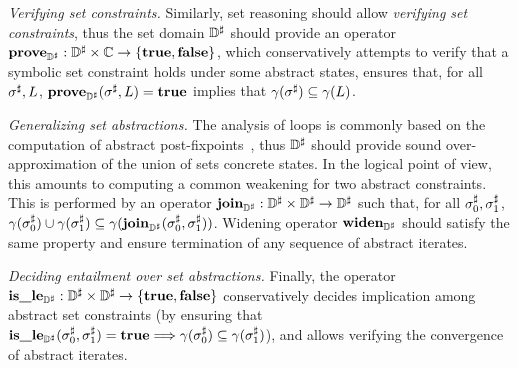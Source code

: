 \begin{asparaitem}
\item \emph{Verifying set constraints.}
  Similarly, set reasoning should allow {\em verifying
    set constraints}, thus the set domain \( {\mathbb{D}}^{\sharp} \) should provide an operator
  \( \textbf{prove}_{{\mathbb{D}}^{\sharp}}: {\mathbb{D}}^{\sharp} \times \mathbb{C} \rightarrow \{ \mathbf{true}, \mathbf{false} \} \),
  which conservatively attempts to verify that a symbolic set constraint
  holds under some abstract states, \ie ensures that, for all \( {\sigma}^{\sharp},
  L \), \( \textbf{prove}_{{\mathbb{D}}^{\sharp}}( {\sigma}^{\sharp}, L ) = \mathbf{true} \) implies that
  \( \gamma( {\sigma}^{\sharp} ) \subseteq \gamma( L ) \).

\item \emph{Generalizing set abstractions.}
  The analysis of loops is commonly based on the computation of abstract
  post-fixpoints~\cite{cc:popl:77}, thus \( {\mathbb{D}}^{\sharp} \) should provide
  sound over-approximation of the union of sets concrete states.
  In the logical point of view, this amounts to computing a common weakening
  for two abstract constraints.
  This is performed by an operator \( \textbf{join}_{{\mathbb{D}}^{\sharp}}: {\mathbb{D}}^{\sharp} \times {\mathbb{D}}^{\sharp}
  \rightarrow {\mathbb{D}}^{\sharp} \) such that, for all \( {\sigma}^{\sharp}_0, {\sigma}^{\sharp}_1 \),
  \( \gamma( {\sigma}^{\sharp}_0 ) \cup \gamma( {\sigma}^{\sharp}_1 ) \subseteq
  \gamma( \textbf{join}_{{\mathbb{D}}^{\sharp}}( {\sigma}^{\sharp}_0, {\sigma}^{\sharp}_1 ) ) \).
  Widening operator \( \textbf{widen}_{{\mathbb{D}}^{\sharp}} \) should satisfy the same property
  and ensure termination of any sequence of abstract iterates.

\item \emph{Deciding entailment over set abstractions.}
  Finally, the operator \( \textbf{is\_le}_{{\mathbb{D}}^{\sharp}}: {\mathbb{D}}^{\sharp} \times {\mathbb{D}}^{\sharp} \rightarrow \{ \mathbf{true},
  \mathbf{false} \} \) conservatively decides implication among abstract set
  constraints (by ensuring that \( \textbf{is\_le}_{{\mathbb{D}}^{\sharp}}( {\sigma}^{\sharp}_0, {\sigma}^{\sharp}_1 ) =
  \mathbf{true} \Longrightarrow \gamma( {\sigma}^{\sharp}_0 ) \subseteq \gamma(
  {\sigma}^{\sharp}_1 ) \)), and allows verifying the convergence of abstract
  iterates.
\end{asparaitem}

